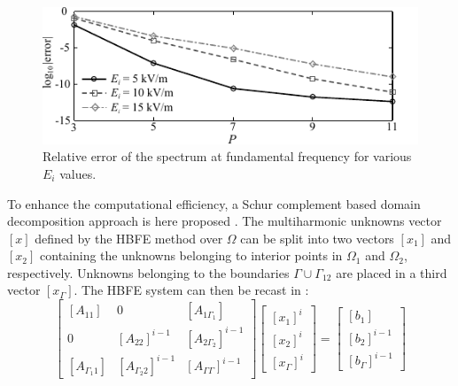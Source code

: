 \begin{figure}[!ht]
\centering
\includegraphics[width=14.4cm]{convergence}
\caption{
Relative error of the spectrum at fundamental frequency for various $E_i$ values.}
\label{fig:convergence}
\end{figure}

To enhance the computational efficiency, a Schur complement based domain decomposition approach is here proposed \cite{Guarnieri2010,Guarnieri2009}. The multiharmonic unknowns vector $[x]$ defined by the HBFE method over $\Omega$ can be split into two vectors $[x_{1}]$ and $[x_{2}]$ containing the unknowns belonging
to interior points in $\Omega_1$ and $\Omega_2$, respectively. Unknowns
belonging to the boundaries $\Gamma\cup\Gamma_{12}$ are placed in a third
vector $[x_{\Gamma}]$. The HBFE system can then be recast in :
%
\begin{equation}\label{eq:DD}
\begin{bmatrix}
 [A_{11}] &  0  &  [A_{1\Gamma_1}] \\
 0  &  [A_{22}]^{i-1} & [A_{2 \Gamma_2}]^{i-1} \\
 [A_{\Gamma_1 1}] & [A_{\Gamma_2 2}]^{i-1} & [A_{\Gamma \Gamma}]^{i-1}
\end{bmatrix}
\begin{bmatrix}
{[x_{1}]^{i}} \\
{[x_{2}]^{i}} \\
{[x_{\Gamma}]^{i}}
\end{bmatrix} 
=
\begin{bmatrix}
{[b_{1}]} \\
{[b_{2}]}^{i-1} \\
{[b_{\Gamma}]}^{i-1}
\end{bmatrix} 
\end{equation}

